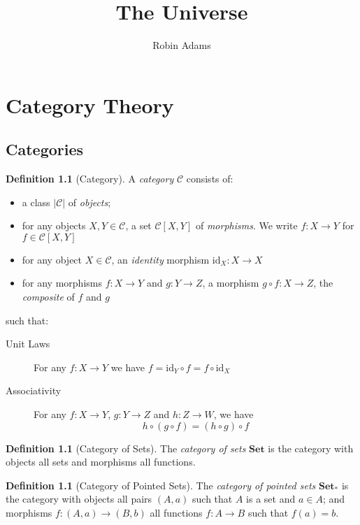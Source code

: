 \documentclass{book}
\title{The Universe}
\author{Robin Adams}
\theoremstyle{definition}
\newtheorem{definition}[lemma]{Definition}
\newcommand{\CC}{\ensuremath{\mathcal{C}}}
\newcommand{\id}[1]{\ensuremath{\mathrm{id}_{#1}}}
\newcommand{\Set}{\ensuremath{\mathbf{Set}}}
\begin{document}
\maketitle
\tableofcontents

\chapter{Category Theory}

\section{Categories}

\begin{definition}[Category]
    A \emph{category} $\CC$ consists of:
    \begin{itemize}
        \item a class $|\CC|$ of \emph{objects};
        \item for any objects $X, Y \in \CC$, a set $\CC[X,Y]$ of \emph{morphisms}. We write $f : X \rightarrow Y$
        for $f \in \CC[X,Y]$
        \item for any object $X \in \CC$, an \emph{identity} morphism $\id{X} : X \rightarrow X$
        \item for any morphisms $f : X \rightarrow Y$ and $g : Y \rightarrow Z$, a morphism $g \circ f : X \rightarrow Z$,
        the \emph{composite} of $f$ and $g$
    \end{itemize}
    such that:
    \begin{description}
        \item[Unit Laws] For any $f : X \rightarrow Y$ we have $f = \id{Y} \circ f = f \circ \id{X}$
        \item[Associativity] For any $f : X \rightarrow Y$, $g : Y \rightarrow Z$ and $h : Z \rightarrow W$, we have
        \[ h \circ (g \circ f) = (h \circ g) \circ f \]
    \end{description}
\end{definition}

\begin{definition}[Category of Sets]
    The \emph{category of sets} $\Set$ is the category with objects all sets and morphisms all functions.
\end{definition}

\begin{definition}[Category of Pointed Sets]
    The \emph{category of pointed sets} $\Set_*$ is the category with objects all pairs $(A,a)$ such that $A$ is a set and $a \in A$;
    and morphisms $f : (A,a) \rightarrow (B,b)$ all functions $f : A \rightarrow B$ such that $f(a) = b$.
\end{definition}
\end{document}
